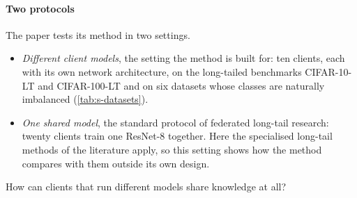 \begin{table}[t]
\centering\small
\caption{The datasets as used in the paper (the paper's dataset table): number of classes, training images held by
the clients, test images, and the realised ratio between the largest and the smallest class. The first two are the
long-tailed benchmarks built with $\rho=100$; the others keep their own class sizes. Look at the last column: the
realised ratios differ from the target 100, and three natural datasets are only mildly imbalanced.}
\label{tab:s-datasets}
\end{table}

\paragraph{Two protocols} The paper tests its method in two settings.
\begin{itemize}
\item \emph{Different client models}, the setting the method is built for: ten clients, each with its own network
architecture, on the long-tailed benchmarks CIFAR-10-LT and CIFAR-100-LT and on six datasets whose classes are
naturally imbalanced (\cref{tab:s-datasets}).
\item \emph{One shared model}, the standard protocol of federated long-tail research: twenty clients train one
ResNet-8 together. Here the specialised long-tail methods of the literature apply, so this setting shows how the
method compares with them outside its own design.
\end{itemize}

How can clients that run different models share knowledge at all?
